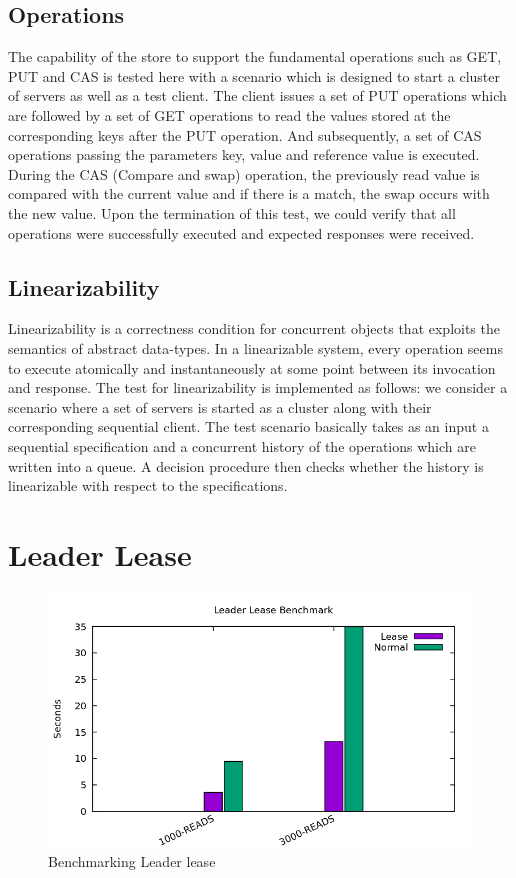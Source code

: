 \documentclass[12pt]{article}
\begin{document}
\subsection{Operations}
The capability of the store to support the fundamental operations such as GET, PUT and CAS is tested here with a scenario which is designed to start a cluster of servers as well as a test client. The client issues a set of PUT operations which are followed by a set of GET operations to read the values stored at the corresponding keys after the PUT operation. And subsequently, a set of CAS operations passing the parameters key, value and reference value is executed. During the CAS (Compare and swap) operation, the previously read value is compared with the current value and if there is a match, the swap occurs with the new value. Upon the termination of this test, we could verify that all operations were successfully executed and expected responses were received.

\subsection{Linearizability}
Linearizability is a correctness condition for concurrent objects that exploits the semantics of abstract data-types. In a linearizable system, every operation seems to execute atomically and instantaneously at some point between its invocation and response. The test for linearizability is implemented as follows: we consider a scenario where a set of servers is started as a cluster along with their corresponding sequential client. The test scenario basically takes as an input a sequential specification and a concurrent history of the operations which are written into a queue. A decision procedure then checks whether the history is linearizable with respect to the specifications. 

\section{Leader Lease}

\begin{figure}[H]
  \centering
  \includegraphics[scale=0.6]{img/benchmark.png}
  \caption[Caption for LOF]{Benchmarking Leader lease	}  
  \label{fig:picture}
\end{figure}
\end{document}
